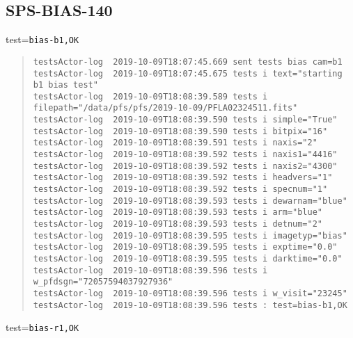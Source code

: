 \subsection{SPS-BIAS-140}
\label{sec:tc-140}

test=\texttt{bias-b1,OK}

\begin{quote}
\begin{tiny}
\begin{verbatim}
testsActor-log  2019-10-09T18:07:45.669 sent tests bias cam=b1
testsActor-log  2019-10-09T18:07:45.675 tests i text="starting b1 bias test"
testsActor-log  2019-10-09T18:08:39.589 tests i filepath="/data/pfs/pfs/2019-10-09/PFLA02324511.fits"
testsActor-log  2019-10-09T18:08:39.590 tests i simple="True"
testsActor-log  2019-10-09T18:08:39.590 tests i bitpix="16"
testsActor-log  2019-10-09T18:08:39.591 tests i naxis="2"
testsActor-log  2019-10-09T18:08:39.592 tests i naxis1="4416"
testsActor-log  2019-10-09T18:08:39.592 tests i naxis2="4300"
testsActor-log  2019-10-09T18:08:39.592 tests i headvers="1"
testsActor-log  2019-10-09T18:08:39.592 tests i specnum="1"
testsActor-log  2019-10-09T18:08:39.593 tests i dewarnam="blue"
testsActor-log  2019-10-09T18:08:39.593 tests i arm="blue"
testsActor-log  2019-10-09T18:08:39.593 tests i detnum="2"
testsActor-log  2019-10-09T18:08:39.595 tests i imagetyp="bias"
testsActor-log  2019-10-09T18:08:39.595 tests i exptime="0.0"
testsActor-log  2019-10-09T18:08:39.595 tests i darktime="0.0"
testsActor-log  2019-10-09T18:08:39.596 tests i w_pfdsgn="72057594037927936"
testsActor-log  2019-10-09T18:08:39.596 tests i w_visit="23245"
testsActor-log  2019-10-09T18:08:39.596 tests : test=bias-b1,OK
\end{verbatim}
\end{tiny}
\end{quote}

\noindent test=\texttt{bias-r1,OK}

